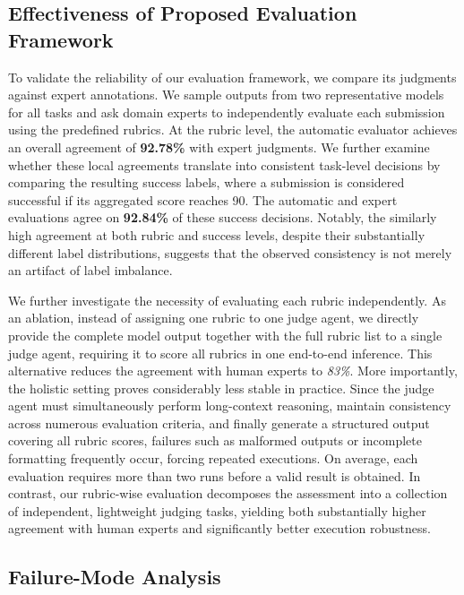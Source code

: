 \subsection{Effectiveness of Proposed Evaluation Framework}
\label{sec:exp-agreement}






To validate the reliability of our evaluation framework, we compare its judgments against expert annotations. We sample outputs from two representative models for all tasks and ask domain experts to independently evaluate each submission using the predefined rubrics. At the rubric level, the automatic evaluator achieves an overall agreement of \textbf{92.78\%} with expert judgments. We further examine whether these local agreements translate into consistent task-level decisions by comparing the resulting success labels, where a submission is considered successful if its aggregated score reaches 90. The automatic and expert evaluations agree on \textbf{92.84\%} of these success decisions. Notably, the similarly high agreement at both rubric and success levels, despite their substantially different label distributions, suggests that the observed consistency is not merely an artifact of label imbalance.


We further investigate the necessity of evaluating each rubric independently. As an ablation, instead of assigning one rubric to one judge agent, we directly provide the complete model output together with the full rubric list to a single judge agent, requiring it to score all rubrics in one end-to-end inference. This alternative reduces the agreement with human experts to \textit{83\%}. More importantly, the holistic setting proves considerably less stable in practice. Since the judge agent must simultaneously perform long-context reasoning, maintain consistency across numerous evaluation criteria, and finally generate a structured output covering all rubric scores, failures such as malformed outputs or incomplete formatting frequently occur, forcing repeated executions. On average, each evaluation requires more than two runs before a valid result is obtained. In contrast, our rubric-wise evaluation decomposes the assessment into a collection of independent, lightweight judging tasks, yielding both substantially higher agreement with human experts and significantly better execution robustness.




\subsection{Failure-Mode Analysis}

